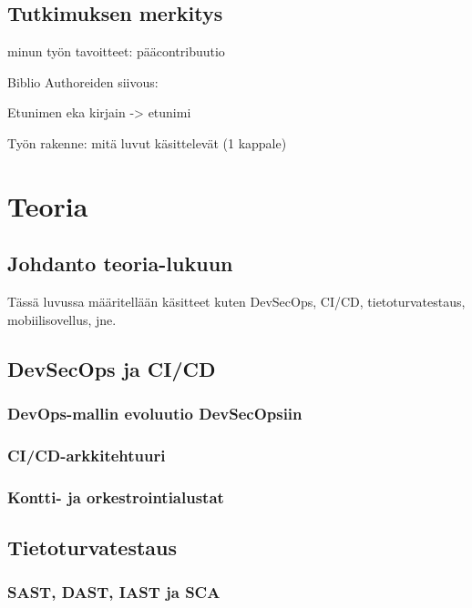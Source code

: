 \documentclass[bscthesis,finnish,oneside,biblatex]{uefcsthesis}
\begin{document}
\section{Tutkimuksen merkitys}
\label{sec:signigicance-of-study}

minun työn tavoitteet: pääcontribuutio

Biblio Authoreiden siivous:

Etunimen eka kirjain -> etunimi

Työn rakenne: mitä luvut käsittelevät (1 kappale)

\chapter{Teoria}
\label{cha:teoria}

\section{Johdanto teoria-lukuun}
\label{sec:teoria-johdanto}

Tässä luvussa määritellään käsitteet kuten DevSecOps, CI/CD, tietoturvatestaus, mobiilisovellus, jne.


\section{DevSecOps ja CI/CD}
\label{sec:devsecops-cicd}
  \subsection{DevOps-mallin evoluutio DevSecOpsiin}
  \subsection{CI/CD-arkkitehtuuri}
  \subsection{Kontti- ja orkestrointialustat}

\section{Tietoturvatestaus}
\label{sec:testing}
  \subsection{SAST, DAST, IAST ja SCA}
\end{document}
